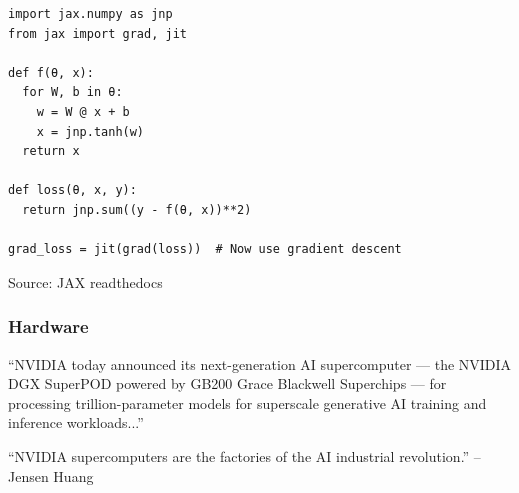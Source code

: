 \documentclass[
    xcolor={svgnames,dvipsnames},
    hyperref={colorlinks, citecolor=DeepPink4, linkcolor=DarkRed, urlcolor=DarkBlue}
    ]{beamer}  %
\newcommand{\1}{\mathbbm 1}
\begin{document}
\begin{frame}[fragile]
    
    \vspace{-1em}
    \begin{verbatim}
import jax.numpy as jnp
from jax import grad, jit

def f(θ, x):
  for W, b in θ:
    w = W @ x + b
    x = jnp.tanh(w)  
  return x

def loss(θ, x, y):
  return jnp.sum((y - f(θ, x))**2)

grad_loss = jit(grad(loss))  # Now use gradient descent 
    \end{verbatim}

    {\footnotesize Source: JAX readthedocs}

\end{frame}

\begin{frame}
    \frametitle{Hardware}
    
    \begin{figure}
       \begin{center}
       \end{center}
    \end{figure}


\end{frame}


\begin{frame} 
    
    ``NVIDIA today announced its next-generation AI supercomputer — the NVIDIA
    DGX SuperPOD powered by GB200 Grace Blackwell Superchips — for
    processing trillion-parameter models for superscale
    generative AI training and inference workloads...''
    \vspace{0.5em}
    \vspace{0.5em}

    \vspace{0.5em}
    \vspace{0.5em}
    ``NVIDIA supercomputers are the factories of the AI industrial
    revolution.'' -- Jensen Huang

\end{frame}
\end{document}
